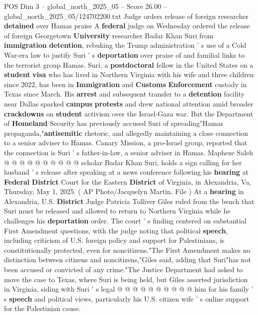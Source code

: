 \begin{textsample}{POS Dim 3 – global\_north\_2025\_05 – Score 26.00 – global\_north\_2025\_05/124702200.txt}  \label{ex:f3_pos_148}
Judge orders release of foreign researcher \textbf{detained} over Hamas praise A \textbf{federal} judge on Wednesday ordered the release of foreign Georgetown \textbf{University} researcher Badar Khan Suri from \textbf{immigration} \textbf{detention}, rebuking the Trump administration ' s use of a Cold War-era law to justify Suri ' s \textbf{deportation} over praise of and familial links to the terrorist group Hamas.
Suri, a \textbf{postdoctoral} fellow in the United States on a \textbf{student} \textbf{visa} who has lived in Northern Virginia with his wife and three children since 2022, has been in \textbf{Immigration} and \textbf{Customs} \textbf{Enforcement} custody in Texas since March.
His \textbf{arrest} and subsequent transfer to a \textbf{detention} facility near Dallas sparked \textbf{campus} \textbf{protests} and drew national attention amid broader \textbf{crackdowns} on \textbf{student} activism over the Israel-Gaza war.
But the Department of \textbf{Homeland} Security has previously accused Suri of spreading"Hamas propaganda,"\textbf{antisemitic} rhetoric, and allegedly maintaining a close connection to a senior adviser to Hamas.
Canary Mission, a pro-Israel group, reported that the connection is Suri ' s father-in-law, a senior adviser in Hamas.
Mapheze Saleh @ @ @ @ @ @ @ @ @ @ scholar Badar Khan Suri, holds a sign calling for her husband ' s release after speaking at a news conference following his \textbf{hearing} at \textbf{Federal} \textbf{District} Court for the Eastern \textbf{District} of Virginia, in Alexandria, Va, Thursday, May 1, 2025. ( AP Photo/Jacquelyn Martin, File ) At a \textbf{hearing} in Alexandria, U.S. \textbf{District} Judge Patricia Tolliver Giles ruled from the bench that Suri must be released and allowed to return to Northern Virginia while he challenges his \textbf{deportation} order.
The court ' s finding centered on substantial First Amendment questions, with the judge noting that political \textbf{speech}, including criticism of U.S. foreign policy and support for Palestinians, is constitutionally protected, even for noncitizens."The First Amendment makes no distinction between citizens and noncitizens,"Giles said, adding that Suri"has not been accused or convicted of any crime."The Justice Department had asked to move the case to Texas, where Suri is being held, but Giles asserted jurisdiction in Virginia, siding with Suri ' s legal @ @ @ @ @ @ @ @ @ @ him for his family ' s \textbf{speech} and political views, particularly his U.S. citizen wife ' s online support for the Palestinian cause.

\end{textsample}
